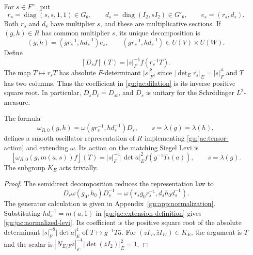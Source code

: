 For $s\in F^\times$, put
\begin{equation}\label{gu:jac:sections}
 r_s=\operatorname{diag}(s,s,1,1)\in G_\theta,
 \qquad d_s=\operatorname{diag}(I_2,sI_2)\in G'_\theta,
 \qquad e_s=(r_s,d_s).
\end{equation}
Both $r_s$ and $d_s$ have multiplier $s$, and these are multiplicative
sections.  If $(g,h)\in R$ has common multiplier $s$, its unique
decomposition is
\begin{equation}\label{gu:jac:semidirect-decomposition}
 (g,h)=(gr_s^{-1},hd_s^{-1})e_s,
 \qquad (gr_s^{-1},hd_s^{-1})\in U(V)\times U(W).
\end{equation}
Define
\begin{equation}\label{gu:jac:dilation}
 [D_sf](T)=|s|_F^{-4}f(r_s^{-1}T).
\end{equation}
The map $T\mapsto r_sT$ has absolute $F$-determinant $|s|_F^8$, since
$|\det_Er_s|_E=|s|_F^4$ and $T$ has two columns.  Thus the coefficient
in \eqref{gu:jac:dilation} is its inverse positive square root.  In
particular, $D_sD_t=D_{st}$, and $D_s$ is unitary for the Schr\"odinger
$L^2$-measure.

\begin{proposition}\label{gu:jac:extension}
The formula
\begin{equation}\label{gu:jac:extension-definition}
 \omega_{R,0}(g,h)
 =\omega(gr_s^{-1},hd_s^{-1})D_s,
 \qquad s=\lambda(g)=\lambda(h),
\end{equation}
defines a smooth oscillator representation of $R$ implementing
\eqref{gu:jac:tensor-action} and extending $\omega$.  Its action on the
matching Siegel Levi is
\begin{equation}\label{gu:jac:normalized-levi}
 [\omega_{R,0}(g,m(a,s))f](T)
 =|s|_F^{-4}|\det a|_E^2f(g^{-1}T\iota(a)),
 \qquad s=\lambda(g).
\end{equation}
The subgroup $K_E$ acts trivially.
\end{proposition}

\begin{proof}
The semidirect decomposition reduces the representation law to
\begin{equation}\label{gu:jac:covariance}
 D_s\omega(g_0,h_0)D_s^{-1}
 =\omega(r_sg_0r_s^{-1},d_sh_0d_s^{-1}).
\end{equation}
The generator calculation is given in Appendix~\ref{gu:app:normalization}.
Substituting $hd_s^{-1}=m(a,1)$ in \eqref{gu:jac:extension-definition}
gives \eqref{gu:jac:normalized-levi}. Its coefficient is the positive square
root of the absolute determinant $|s|_F^{-8}|\det a|_E^4$ of
$T\mapsto g^{-1}T\bar a$. For $(zI_V,\bar zI_W)\in K_E$, the argument
is $T$ and the scalar is
$|N_{E/F}z|_F^{-4}|\det(\bar zI_2)|_E^2=1$.
\end{proof}

